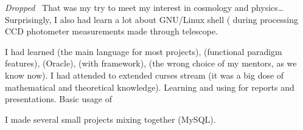 \documentclass[10pt,a4paper,ragged2e,withhyper]{altacv}
\begin{document}
\begin{paracol}{2}
\divider

  \textit{Dropped} \,
  That was my try to meet my interest in cosmology and physics… Surprisingly,
  I also had learn a lot about GNU/Linux shell (   
  during processing CCD photometer measurements made through telescope.

\divider

  I had learned  (the main language for most projects),  (functional
  paradigm features),     (Oracle),  (with 
  framework),  (the wrong choice of my mentors, as we know
  now). I had attended to extended curses stream (it was a big dose of
  mathematical and theoretical knowledge). Learning and using  for
  reports and presentations. Basic usage of 

\divider

  I made several small projects mixing together    
   (MySQL).

\end{paracol}
\end{document}

